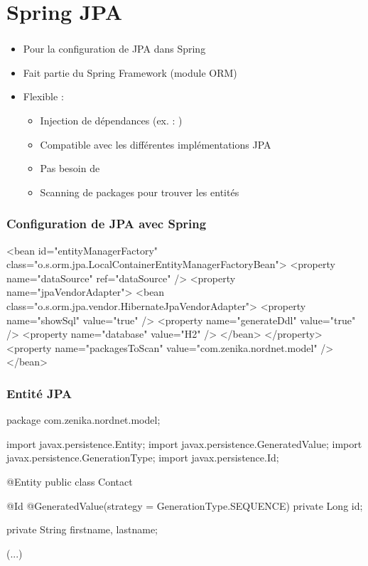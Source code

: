 \section{Spring JPA}



\begin{frame}
 \frametitle{}
 \begin{itemize}
  \item Pour la configuration de JPA dans Spring
  \item Fait partie du Spring Framework (module ORM)
  \item Flexible :
  \begin{itemize}  
    \item Injection de dépendances (ex. : )
    \item Compatible avec les différentes implémentations JPA
    \item Pas besoin de 
    \item Scanning de packages pour trouver les entités
  \end{itemize}
 \end{itemize}

\end{frame}


\begin{frame}[fragile]
 \frametitle{Configuration de JPA avec Spring}

 \begin{xmlcode}
<bean id="entityManagerFactory"
      class="o.s.orm.jpa.LocalContainerEntityManagerFactoryBean">
  <property name="dataSource" ref="dataSource" />
  <property name="jpaVendorAdapter">
    <bean class="o.s.orm.jpa.vendor.HibernateJpaVendorAdapter">
      <property name="showSql" value="true" />
      <property name="generateDdl" value="true" />
      <property name="database" value="H2" />
    </bean>
  </property>
  <property name="packagesToScan" value="com.zenika.nordnet.model" />
</bean>
 \end{xmlcode}
\end{frame}

\begin{frame}[fragile]
 \frametitle{Entité JPA}

 \begin{javacode}
package com.zenika.nordnet.model;

import javax.persistence.Entity;
import javax.persistence.GeneratedValue;
import javax.persistence.GenerationType;
import javax.persistence.Id;

@Entity
public class Contact {

  @Id
  @GeneratedValue(strategy = GenerationType.SEQUENCE)
  private Long id;

  private String firstname, lastname;
  
  (...)
}
 \end{javacode}
\end{frame}

